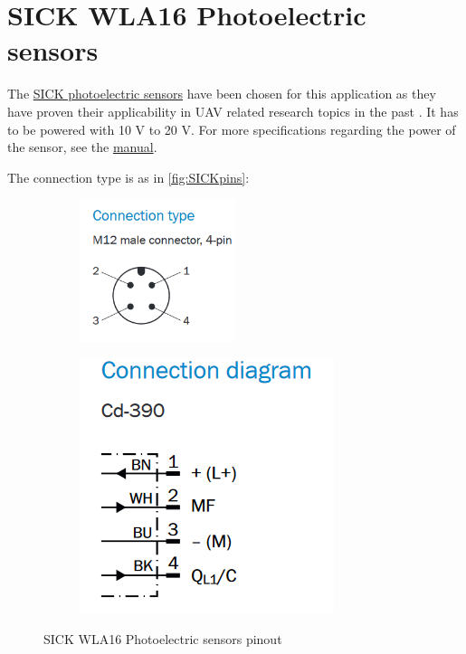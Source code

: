 \documentclass[a4paper]{article}
\begin{document}
\section{SICK WLA16 Photoelectric sensors}

The \hyperref{https://www.sick.com/us/en/photoelectric-sensors/photoelectric-sensors/w16/wla16p-24162100a00/p/p512654}{sensors}{SICK}{SICK photoelectric sensors} have been chosen for this application as they have proven their applicability in UAV related research topics in the past \cite{Scanavino2021}. It has to be powered with 10 V to 20 V. For more specifications regarding the power of the sensor, see the \hyperref{https://cdn.sick.com/media/pdf/4/54/654/dataSheet_WLA16P-24162100A00_1218660_en.pdf}{category}{name}{manual}.

The connection type is as in \autoref{fig:SICKpins}:

\begin{figure}[h!]
	\begin{subfigure}{.5\textwidth}
		\centering
		\includegraphics[width=0.5\textwidth]{SICKpins1.png}
		\label{fig:SICKpins2}
	\end{subfigure}%
	\begin{subfigure}{.5\textwidth}
		\centering
		\includegraphics[width=.5\linewidth]{SICKpins2.png}
		\label{fig:SICKpins2}
	\end{subfigure}
	\caption{SICK WLA16 Photoelectric sensors pinout}
	\label{fig:SICKpins}
\end{figure} 
\end{document}

